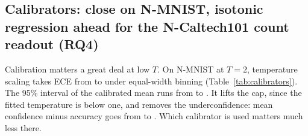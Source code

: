 \documentclass[10pt]{article}
\begin{document}
\subsection{Calibrators: close on N-MNIST, isotonic regression ahead for the N-Caltech101 count readout (RQ4)}
\label{sec:calibrators}

Calibration matters a great deal at low $T$. On N-MNIST at $T=2$, temperature scaling takes ECE
from \hdNmTwoUncW{} to \hdNmTwoTempW{} under equal-width binning (Table~\ref{tab:calibrators}). %
The 95\% interval of the calibrated mean runs from \hdNmTwoTempWLo{} to \hdNmTwoTempWHi. It %
lifts the cap, since the fitted temperature is below one, and removes the underconfidence: mean
confidence minus accuracy goes from \gapCalNmTwoUnc{} to \gapCalNmTwoTemp. Which calibrator is %
used matters much less there.
\end{document}

